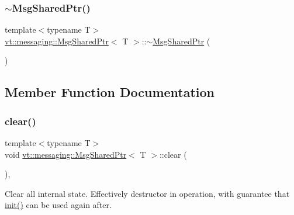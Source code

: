 \subsubsection{\texorpdfstring{$\sim$\+Msg\+Shared\+Ptr()}{~MsgSharedPtr()}}
{\footnotesize\ttfamily template$<$typename T$>$ \\
\hyperlink{structvt_1_1messaging_1_1_msg_shared_ptr}{vt\+::messaging\+::\+Msg\+Shared\+Ptr}$<$ T $>$\+::$\sim$\hyperlink{structvt_1_1messaging_1_1_msg_shared_ptr}{Msg\+Shared\+Ptr} (\begin{DoxyParamCaption}{ }\end{DoxyParamCaption})\hspace{0.3cm}{\ttfamily [inline]}}



\subsection{Member Function Documentation}
\mbox{\label{structvt_1_1messaging_1_1_msg_shared_ptr_ace4439c8585f3d3c50b861570db07d99}} 
\subsubsection{\texorpdfstring{clear()}{clear()}}
{\footnotesize\ttfamily template$<$typename T$>$ \\
void \hyperlink{structvt_1_1messaging_1_1_msg_shared_ptr}{vt\+::messaging\+::\+Msg\+Shared\+Ptr}$<$ T $>$\+::clear (\begin{DoxyParamCaption}{ }\end{DoxyParamCaption})\hspace{0.3cm}{\ttfamily [inline]}, {\ttfamily [private]}}

Clear all internal state. Effectively destructor in operation, with guarantee that \hyperlink{structvt_1_1messaging_1_1_msg_shared_ptr_a7117c1a8364c3267d4694b79a2f5cc6b}{init()} can be used again after. \mbox{\label{structvt_1_1messaging_1_1_msg_shared_ptr_a6e6e25e087e662d9171fa20b5092efdd}} 
